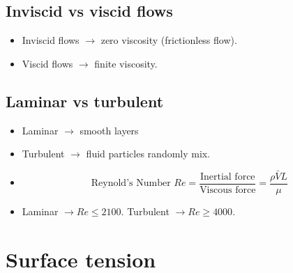 \documentclass[12pt]{report}
\theoremstyle{remark}
\begin{document}
\subsection{Inviscid vs viscid flows}%
\label{sub:Inviscid vs viscid flows}

\begin{itemize}
    \item Inviscid flows $ \rightarrow $ zero viscosity (frictionless flow).
    \item Viscid flows $ \rightarrow $ finite viscosity. 
\end{itemize}

\subsection{Laminar vs turbulent}%
\label{sub:Laminar vs turbulent}

\begin{itemize}
    \item Laminar $ \rightarrow $ smooth layers
    \item Turbulent $ \rightarrow $ fluid particles randomly mix. 
    \item \[ \text{Reynold's Number } Re = \frac{\text{Inertial force}}{\text{Viscous force}} = \frac{\rho \bar{V} L}{\mu} \]
    \item Laminar $ \rightarrow Re \leq 2100 $. Turbulent $ \rightarrow Re \geq 4000 $.
\end{itemize}

\section{Surface tension}%
\label{sec:Surface tension}
\end{document}
